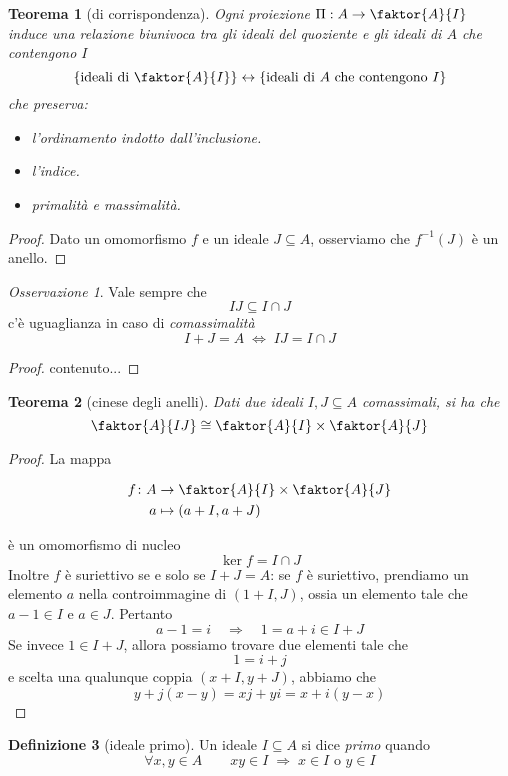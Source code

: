 \documentclass[a4paper]{article}
\newtheorem{theorem}{Teorema}[section]
\theoremstyle{remark}
\newtheorem*{remark}{Osservazione}
\theoremstyle{definition}
\newtheorem{definition}[theorem]{Definizione}
\newcommand{\fun}[5]{
	\begin{align*}
	#1 \colon #2 &\to #3 \\
	#4 &\mapsto #5
	\end{align*}
}
\begin{document}
\begin{multicols}{2}
\begin{theorem}[di corrispondenza]\label{corr}
	Ogni proiezione $ \Pi : A \to \faktor{A}{I} $ induce una relazione biunivoca tra gli ideali del quoziente e gli ideali di $ A $ che contengono $ I $
	\[ \{ \text{ideali di }\faktor{A}{I} \} \leftrightarrow \{ \text{ideali di $ A $ che contengono $ I $} \} \]
	che preserva:
	\begin{itemize}
		\item l'ordinamento indotto dall'inclusione.
		\item l'indice.
		\item primalità e massimalità.
	\end{itemize}
\end{theorem}
\begin{proof}
	Dato un omomorfismo $ f $ e un ideale $ J \subseteq A $, osserviamo che $ f^{-1}(J) $ è un anello.
\end{proof}
\begin{remark}
	Vale sempre che
	\[ IJ \subseteq I \cap J \]
	c'è uguaglianza in caso di \emph{comassimalità}
	\[ I + J = A \;\Leftrightarrow\; IJ = I \cap J \]
\end{remark}
\begin{proof}
	contenuto...
\end{proof}

\begin{theorem}[cinese degli anelli]
	Dati due ideali $ I, J \subseteq A $ comassimali, si ha che
	\[ \faktor{A}{IJ} \cong \faktor{A}{I} \times \faktor{A}{J} \]
\end{theorem}
\begin{proof}
	La mappa
	\fun{f}{A}{\faktor{A}{I} \times \faktor{A}{J}}{a}{(a + I, a + J)}
	è un omomorfismo di nucleo
	\[ \ker f = I \cap J \]
	Inoltre $ f $ è suriettivo se e solo se $ I + J = A $: se $ f $ è suriettivo, prendiamo un elemento $ a $ nella controimmagine di $ (1 + I, J) $, ossia un elemento tale che 
	$ a-1 \in I $ e $ a \in J $.
	Pertanto 
	\[ a-1 = i \quad\Rightarrow\quad 1 = a + i \in I + J \]
	Se invece $ 1 \in I + J $, allora possiamo trovare due elementi tale che \[ 1 = i + j \]
	e scelta una qualunque coppia $ (x + I, y + J) $, abbiamo che
	\[ y + j(x-y) = xj + yi = x + i(y-x) \]
\end{proof}

\begin{definition}[ideale primo]
	Un ideale $ I \subseteq A $ si dice \emph{primo} quando
	\[ \forall x, y \in A \qquad xy \in I \;\Rightarrow\; x \in I \text{ o } y \in I \]
\end{definition}


\end{multicols}
\end{document}
